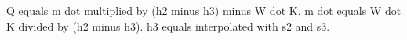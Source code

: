 Q equals m dot multiplied by (h2 minus h3) minus W dot K.  
m dot equals W dot K divided by (h2 minus h3).  
h3 equals interpolated with s2 and s3.